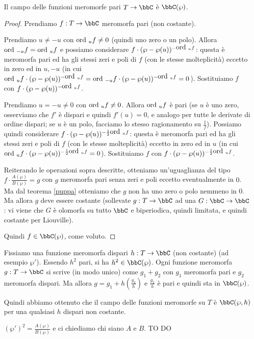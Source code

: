 \begin{teorema}
Il campo delle funzioni meromorfe pari $T\rar\bbC$ è $\bbC(\wp)$.
\end{teorema}
\begin{proof}
Prendiamo $f:T\rar\bbC$ meromorfa pari (non costante).

Prendiamo $u\not=-u$ con $\mbox{ord }_uf\not=0$ (quindi uno zero o un polo). Allora $\mbox{ord }_{-u}f=\mbox{ord }_uf$ e possiamo considerare $f\cdot(\wp-\wp(u))^{-\mbox{ord }_uf}$:
questa è meromorfa pari ed ha gli stessi zeri e poli di $f$ (con le stesse molteplicità) eccetto
in zero ed in $u,-u$ (in cui $\mbox{ord }_uf\cdot(\wp-\wp(u))^{-\mbox{ord }_uf}=\mbox{ord }_{-u}f\cdot(\wp-\wp(u))^{-\mbox{ord }_uf}=0$).
Sostituiamo $f$ con $f\cdot(\wp-\wp(u))^{-\mbox{ord }_uf}$.

Prendiamo $u=-u\not=0$ con $\mbox{ord }_uf\not=0$. Allora $\mbox{ord }_uf$ è pari (se $u$ è uno zero, osserviamo che $f'$ è dispari e quindi $f'(u)=0$, e analogo per tutte le derivate di ordine dispari;
se $u$ è un polo, facciamo lo stesso ragionamento su $\frac{1}{f}$). Possiamo quindi considerare $f\cdot(\wp-\wp(u))^{-\frac{1}{2}\mbox{ord }_uf}$:
questa è meromorfa pari ed ha gli stessi zeri e poli di $f$ (con le stesse molteplicità) eccetto in zero ed in $u$ (in cui $\mbox{ord }_uf\cdot(\wp-\wp(u))^{-\frac{1}{2}\mbox{ord }_uf}=0$).
Sostituiamo $f$ con $f\cdot(\wp-\wp(u))^{-\frac{1}{2}\mbox{ord }_uf}$.

Reiterando le operazioni sopra descritte, otteniamo un'uguaglianza del tipo $f\cdot\frac{A(\wp)}{B(\wp)}=g$ con $g$ meromorfa pari senza zeri e poli eccetto eventualmente in $0$.
Ma dal teorema \ref{puppa} otteniamo che $g$ non ha uno zero o polo nemmeno in $0$. Ma allora $g$ deve essere costante
(sollevate $g:T\rar\bbC$ ad una $G:\bbC\rar\bbC$: vi viene che $G$ è olomorfa su tutto $\bbC$ e biperiodica, quindi limitata, e quindi costante per Liouville).

Quindi $f\in\bbC(\wp)$, come voluto.
\end{proof}


Fissiamo una funzione meromorfa dispari $h:T\rar\bbC$ (non costante) (ad esempio $\wp'$).
Essendo $h^2$ pari, si ha $h^2\in\bbC(\wp)$.
Ogni funzione meromorfa $g:T\rar\bbC$ si scrive (in modo unico) come $g_1+g_2$ con $g_1$ meromorfa pari e $g_2$ meromorfa dispari.
Ma allora $g=g_1+h(\frac{g_2}{h})$ e $\frac{g_2}{h}$ è pari e quindi sta in $\bbC(\wp)$.

Quindi abbiamo ottenuto che il campo delle funzioni meromorfe su $T$ è $\bbC(\wp,h)$ per una qualsiasi $h$ dispari non costante.


$(\wp')^2=\frac{A(\wp)}{B(\wp)}$ e ci chiediamo chi siano $A$ e $B$. TO DO













